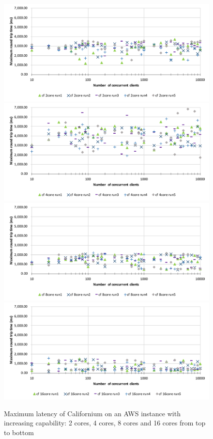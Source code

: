\begin{figure}[!htbp]
\centering
\includegraphics[scale=0.6]{cf_max_latency_2cores}
\includegraphics[scale=0.6]{cf_max_latency_4cores}
\includegraphics[scale=0.6]{cf_max_latency_8cores}
\includegraphics[scale=0.6]{cf_max_latency_16cores}
\caption[Maximum latency of Californium on an AWS instance with increasing capability]{Maximum latency of Californium on an AWS instance with increasing capability: 2 cores, 4 cores, 8 cores and 16 cores from top to bottom}
\label{fig:cf_max_latency}
\end{figure}

